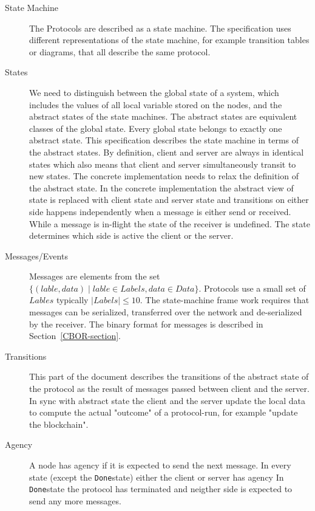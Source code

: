 \documentclass{report}
\newcommand{\wip}[1]{\color{magenta}{#1}\color{black}}
\newcommand{\state}[1]{\texttt{#1}}
\newcommand{\Done}{\state{Done}}
\theoremstyle{definition}{
  \newtheorem{lemma}{Lemma}[section] %
  \newtheorem{definition}[lemma]{Definition}
}
\theoremstyle{theorem}{
  \newtheorem{invariant}[lemma]{Invariant}
  \newtheorem{proofobligation}[lemma]{Proof Obligation}
}
\numberwithin{equation}{lemma}
\begin{document}
\begin{description}
\item[State Machine]
  The Protocols are described as a state machine.
  The specification uses different representations of the state machine,
  for example transition tables or diagrams, that all describe the same protocol.

\item[States]
  We need to distinguish between the global state of a system,
  which includes the values of all local variable stored on the nodes,
  and the abstract states of the state machines.
  The abstract states are equivalent classes of the global state.
  Every global state belongs to exactly one abstract state.
  This specification describes the state machine in terms of the abstract states.
  By definition, client and server are always in identical states
  which also means that client and server simultaneously transit to new states.
  The concrete implementation needs to relax the definition of the abstract state.
  In the concrete implementation the abstract view of state is replaced with
  client state and server state and transitions on either side happens independently
  when a message is either send or received.
  While a message is in-flight the state of the receiver is undefined.
  The state determines which side is active the client or the server.
  
\item[Messages/Events]
  Messages are elements from the set
  $\{(lable, data) \mid lable \in Labels, data \in Data\}$.
  Protocols use a small set of $Lables$ typically $|Labels| \leq 10$.
  The state-machine frame work requires that messages can be serialized,
  transferred over the network and de-serialized by the receiver.
  The binary format for messages is described in Section~\ref{CBOR-section}.

\item[Transitions]
  This part of the document describes the transitions of the abstract state of the protocol
  as the result of messages passed between client and the server.
  In sync with abstract state the client and the server update the local data
  to compute the actual "outcome" of a protocol-run, for example "update the
  blockchain".
  \wip{WIP: there are also hard contraints on the transitions, e.g. transaction is valid,etc}

\item[Agency]
  A node has agency if it is expected to send the next message.
  In every state (except the \Done state) either the client or server has agency
  In \Done state the protocol has terminated and neigther side is expected to send any more messages.


\end{description}
\end{document}
